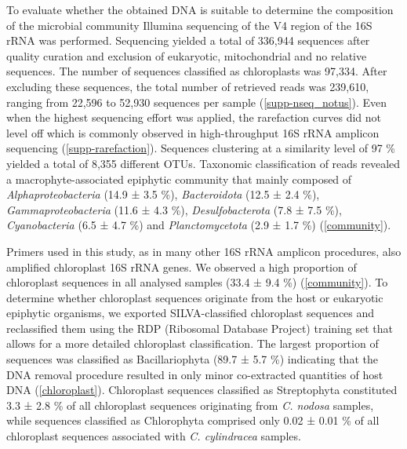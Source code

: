 \documentclass[12pt,]{article}
\begin{document}
To evaluate whether the obtained DNA is suitable to determine the
composition of the microbial community Illumina sequencing of the V4
region of the 16S rRNA was performed. Sequencing yielded a total of
336,944 sequences after quality curation and exclusion of eukaryotic,
mitochondrial and no relative sequences. The number of sequences
classified as chloroplasts was 97,334. After excluding these sequences,
the total number of retrieved reads was 239,610, ranging from 22,596 to
52,930 sequences per sample (\autoref{supp-nseq_notus}). Even when the
highest sequencing effort was applied, the rarefaction curves did not
level off which is commonly observed in high-throughput 16S rRNA
amplicon sequencing (\autoref{supp-rarefaction}). Sequences clustering
at a similarity level of 97 \si{\percent} yielded a total of 8,355
different OTUs. Taxonomic classification of reads revealed a
macrophyte-associated epiphytic community that mainly composed of
\emph{Alphaproteobacteria} (14.9 ± 3.5 \si{\percent}),
\emph{Bacteroidota} (12.5 ± 2.4 \si{\percent}),
\emph{Gammaproteobacteria} (11.6 ± 4.3 \si{\percent}),
\emph{Desulfobacterota} (7.8 ± 7.5 \si{\percent}), \emph{Cyanobacteria}
(6.5 ± 4.7 \si{\percent}) and \emph{Planctomycetota} (2.9 ± 1.7
\si{\percent}) (\autoref{community}).

Primers used in this study, as in many other 16S rRNA amplicon
procedures, also amplified chloroplast 16S rRNA genes. We observed a
high proportion of chloroplast sequences in all analysed samples (33.4 ±
9.4 \si{\percent}) (\autoref{community}). To determine whether
chloroplast sequences originate from the host or eukaryotic epiphytic
organisms, we exported SILVA-classified chloroplast sequences and
reclassified them using the RDP (Ribosomal Database Project) training
set that allows for a more detailed chloroplast classification. The
largest proportion of sequences was classified as Bacillariophyta (89.7
± 5.7 \si{\percent}) indicating that the DNA removal procedure resulted
in only minor co-extracted quantities of host DNA
(\autoref{chloroplast}). Chloroplast sequences classified as
Streptophyta constituted 3.3 ± 2.8 \si{\percent} of all chloroplast
sequences originating from \emph{C. nodosa} samples, while sequences
classified as Chlorophyta comprised only 0.02 ± 0.01 \si{\percent} of
all chloroplast sequences associated with \emph{C. cylindracea} samples.
\end{document}
